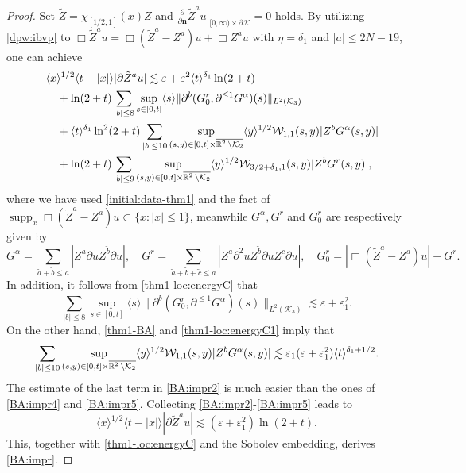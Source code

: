\documentclass[11pt,twoside]{article}
\def\cK{\mathcal K}
\def\cW{\mathcal W}
\def\R{\mathop{\mathbb R\kern 0pt}\nolimits}
\def\ds{\displaystyle}
\def\supp{\mathop{\rm supp}\nolimits}
\def\p{\partial}
\def\ve{\varepsilon}
\def\supp{\operatorname{supp}}
\def\ls{\lesssim}
\def\bn{\mathbf{n}}
\newcommand{\w}[1]{\langle {#1} \rangle}
\theoremstyle{plain}
\theoremstyle{definition}
\numberwithin{equation}{section}
\begin{document}
\begin{proof}
Set $\tilde Z=\chi_{[1/2,1]}(x)Z$ and $\ds\frac{\p}{\p\bn}\tilde Z^au|_{[0,\infty)\times\p\cK}=0$ holds.
By utilizing \eqref{dpw:ibvp} to $\Box\tilde Z^au=\Box(\tilde Z^a-Z^a)u+\Box Z^au$ with $\eta=\delta_1$ and $|a|\le2N-19$,
one can achieve
\begin{equation}\label{BA:impr2}
\begin{split}
&\quad\w{x}^{1/2}\w{t-|x|}|\p\tilde Z^au|
\ls\ve+\ve^2\w{t}^{\delta_1}\ln(2+t)\\
&\qquad+\ln(2+t)\sum_{|b|\le8}\sup_{s\in[0,t]}\w{s}\|\p^b(G_0^r,\p^{\le1}G^\alpha)(s)\|_{L^2(\cK_3)}\\
&\qquad+\w{t}^{\delta_1}\ln^2(2+t)\sum_{|b|\le10}\sup_{(s,y)\in[0,t]\times\overline{\R^2\setminus\cK_2}}\w{y}^{1/2}\cW_{1,1}(s,y)|Z^bG^\alpha(s,y)|\\
&\qquad+\ln(2+t)\sum_{|b|\le9}\sup_{(s,y)\in[0,t]\times\overline{\R^2\setminus\cK_2}}\w{y}^{1/2}\cW_{3/2+\delta_1,1}(s,y)|Z^bG^r(s,y)|,
\end{split}
\end{equation}
where we have used \eqref{initial:data-thm1} and the fact of $\supp_x\Box(\tilde Z^a-Z^a)u\subset\{x:|x|\le1\}$,
meanwhile $G^{\alpha}, G^r$ and $G_0^r$ are respectively given by
\begin{equation}\label{BA:impr3}
G^{\alpha}=\sum_{\tilde a+\tilde b\le a}|Z^{\tilde a}\p uZ^{\tilde b}\p u|,\quad
G^r=\sum_{\tilde a+\tilde b+\tilde c\le a}|Z^{\tilde a}\p^2uZ^{\tilde b}\p uZ^{\tilde c}\p u|,\quad G_0^r=|\Box(\tilde Z^a-Z^a)u|+G^r.
\end{equation}
In addition, it follows from \eqref{thm1-loc:energyC} that
\begin{equation}\label{BA:impr4}
\sum_{|b|\le8}\sup_{s\in[0,t]}\w{s}\|\p^b(G_0^r,\p^{\le1}G^\alpha)(s)\|_{L^2(\cK_3)}\ls\ve+\ve_1^2.
\end{equation}
On the other hand, \eqref{thm1-BA} and \eqref{thm1-loc:energyC1} imply that
\begin{equation}\label{BA:impr5}
\sum_{|b|\le10}\sup_{(s,y)\in[0,t]\times\overline{\R^2\setminus\cK_2}}\w{y}^{1/2}\cW_{1,1}(s,y)|Z^bG^\alpha(s,y)|
\ls\ve_1(\ve+\ve_1^2)\w{t}^{\delta_1+1/2}.
\end{equation}
The estimate of the last term in \eqref{BA:impr2} is much easier than the ones of \eqref{BA:impr4} and \eqref{BA:impr5}.
Collecting \eqref{BA:impr2}-\eqref{BA:impr5} leads to
\begin{equation*}
\w{x}^{1/2}\w{t-|x|}|\p\tilde Z^au|\ls(\ve+\ve_1^2)\ln(2+t).
\end{equation*}
This, together with \eqref{thm1-loc:energyC} and the Sobolev embedding, derives \eqref{BA:impr}.
\end{proof}
\end{document}
